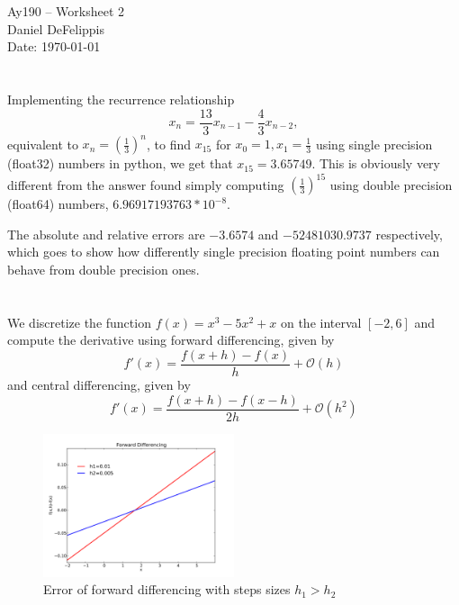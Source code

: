 \documentclass[11pt,letterpaper]{article}
\begin{document}
\begin{center}
\Large
Ay190 -- Worksheet 2\\
Daniel DeFelippis\\
Date: \today
\end{center}


\section{}
Implementing the recurrence relationship 
$$x_n = \frac{13}{3}x_{n-1} - \frac{4}{3}x_{n-2},$$ 
equivalent to $x_n = \left(\frac{1}{3}\right)^{n}$, 
to find $x_{15}$ for $x_0 = 1, x_1 = \frac{1}{3}$ 
using single precision (float32) numbers in python, we get that $x_{15} = 3.65749$. 
This is obviously very different from the answer found simply computing
$\left(\frac{1}{3}\right)^{15}$ using double precision (float64) numbers, $6.96917193763*10^{-8}$.

The absolute and relative errors are $-3.6574$ and $-52481030.9737$ 
respectively, which goes to show how differently single precision floating
point numbers can behave from double precision ones.

\section{}


We discretize the function $f(x) = x^3 - 5x^2 + x$ on the interval $[-2, 6]$
and compute the derivative using forward differencing, given by 
$$f'(x) = \frac{f(x+h) - f(x)}{h} + \mathcal{O}(h)$$ and central 
differencing, given by 
$$f'(x) = \frac{f(x+h) - f(x-h)}{2h} + \mathcal{O}(h^2)$$

\begin{figure}[bth]
\centering
\includegraphics[width=0.5\textwidth]{forward_differencing.pdf}
\caption{Error of forward differencing with steps sizes $h_1 > h_2$}
\label{fig:forward}
\end{figure}
\end{document}
